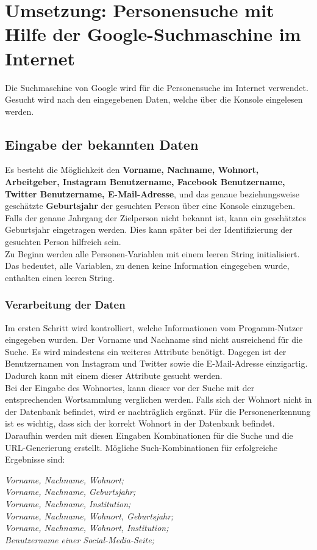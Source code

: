 \section{Umsetzung: Personensuche mit Hilfe der Google-Suchmaschine im Internet}
Die Suchmaschine von Google wird für die Personensuche im Internet verwendet. Gesucht wird nach den eingegebenen Daten, welche über die Konsole eingelesen werden.

	\subsection{Eingabe der bekannten Daten}
	Es besteht die Möglichkeit den \textbf{Vorname, Nachname, Wohnort, Arbeitgeber, Instagram Benutzername, Facebook Benutzername, Twitter Benutzername, E-Mail-Adresse}, und das genaue beziehungsweise geschätzte \textbf{Geburtsjahr} der gesuchten Person über eine Konsole einzugeben. Falls der genaue Jahrgang der Zielperson nicht bekannt ist, kann ein geschätztes Geburtsjahr eingetragen werden. Dies kann später bei der Identifizierung der gesuchten Person hilfreich sein.\\
	Zu Beginn werden alle Personen-Variablen mit einem leeren String initialisiert. Das bedeutet, alle Variablen, zu denen keine Information eingegeben wurde, enthalten einen leeren String.
	
		\subsubsection{Verarbeitung der Daten}
		Im ersten Schritt wird kontrolliert, welche Informationen vom Progamm-Nutzer eingegeben wurden. Der Vorname und Nachname sind nicht ausreichend für die Suche. Es wird mindestens ein weiteres Attribute benötigt. Dagegen ist der Benutzernamen von Instagram und Twitter sowie die E-Mail-Adresse einzigartig. Dadurch kann mit einem dieser Attribute gesucht werden.\\
		Bei der Eingabe des Wohnortes, kann dieser vor der Suche mit der entsprechenden Wortsammlung verglichen werden. Falls sich der Wohnort nicht in der Datenbank befindet, wird er nachträglich ergänzt. Für die Personenerkennung ist es wichtig, dass sich der korrekt Wohnort in der Datenbank befindet.\\
		Daraufhin werden mit diesen Eingaben Kombinationen für die Suche und die URL-Generierung erstellt. Mögliche Such-Kombinationen für erfolgreiche Ergebnisse sind:
		
		\textit{Vorname, Nachname, Wohnort;}\\
		\textit{Vorname, Nachname, Geburtsjahr;}\\
		\textit{Vorname, Nachname, Institution;}\\
		\textit{Vorname, Nachname, Wohnort, Geburtsjahr;}\\
		\textit{Vorname, Nachname, Wohnort, Institution;}\\
		\textit{Benutzername einer Social-Media-Seite;}
		
